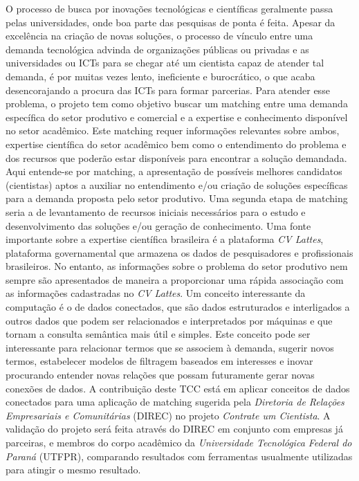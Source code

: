 \begin{resumoutfpr}
    O processo de busca por inovações tecnológicas e científicas geralmente passa pelas universidades, onde boa parte das pesquisas de ponta é feita. Apesar da excelência na criação de novas soluções, o processo de vínculo entre uma demanda tecnológica advinda de organizações públicas ou privadas e as universidades ou ICTs para se chegar até um cientista capaz de atender tal demanda, é por muitas vezes lento, ineficiente e burocrático, o que acaba desencorajando a procura das ICTs para formar parcerias. Para atender esse problema, o projeto tem como objetivo buscar um matching entre uma demanda específica do setor produtivo e comercial e a expertise e conhecimento disponível no setor acadêmico. Este matching requer informações relevantes sobre ambos, expertise científica do setor acadêmico bem como o entendimento do problema e dos recursos que poderão estar disponíveis para encontrar a solução demandada. Aqui entende-se por matching, a apresentação de possíveis melhores candidatos (cientistas) aptos a auxiliar no entendimento e/ou criação de soluções específicas para a demanda proposta pelo setor produtivo. Uma segunda etapa de matching seria a de levantamento de recursos iniciais necessários para o estudo e desenvolvimento das soluções e/ou geração de conhecimento. Uma fonte importante sobre a expertise científica brasileira é a plataforma \emph{CV Lattes}, plataforma governamental que armazena os dados de pesquisadores e profissionais brasileiros. No entanto, as informações sobre o problema do setor produtivo nem sempre são apresentados de maneira a proporcionar uma rápida associação com as informações cadastradas no \emph{CV Lattes}.
    Um conceito interessante da computação é o de dados conectados, que são dados estruturados e interligados a outros dados que podem ser relacionados e interpretados por máquinas e que tornam a consulta semântica mais útil e simples. Este conceito pode ser interessante para relacionar termos que se associem à demanda, sugerir novos termos, estabelecer modelos de filtragem baseados em interesses e inovar procurando entender novas relações que possam futuramente gerar novas conexões de dados. A contribuição deste TCC está em aplicar conceitos de dados conectados para uma aplicação de matching sugerida pela \emph{Diretoria de Relações Empresariais e Comunitárias} (DIREC) no projeto \emph{Contrate um Cientista}. A validação do projeto será feita através do DIREC em conjunto com empresas já parceiras, e membros do corpo acadêmico da \emph{Universidade Tecnológica Federal do Paraná} (UTFPR), comparando resultados com ferramentas usualmente utilizadas para atingir o mesmo resultado.
\end{resumoutfpr}